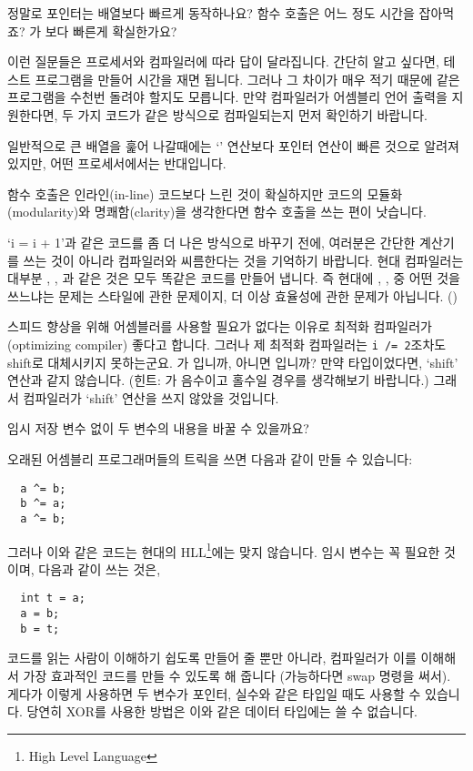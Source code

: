 \begin{faq}
	정말로 포인터는 배열보다 빠르게 동작하나요?
	함수 호출은 어느 정도 시간을 잡아먹죠?
	가 보다 빠른게 확실한가요?

\A
	이런 질문들은 프로세서와 컴파일러에 따라 답이 달라집니다.
	간단히 알고 싶다면, 테스트 프로그램을 만들어 시간을 재면 됩니다.
	그러나 그 차이가 매우 적기 때문에 같은 프로그램을 수천번 돌려야
	할지도 모릅니다.  만약 컴파일러가 어셈블리 언어 출력을 지원한다면,
	두 가지 코드가 같은 방식으로 컴파일되는지 먼저 확인하기 바랍니다.

	일반적으로 큰 배열을 훑어 나갈때에는 `\TT{[]}' 연산보다
	포인터 연산이 빠른 것으로 알려져 있지만, 어떤 프로세서에서는
	반대입니다.

	함수 호출은 인라인(in-line) 코드보다 느린 것이 확실하지만 
	코드의 모듈화(modularity)와 명쾌함(clarity)을 생각한다면
	함수 호출을 쓰는 편이 낫습니다.

	`i = i + 1'과 같은 코드를 좀 더 나은 방식으로 바꾸기 전에,
	여러분은 간단한 계산기를 쓰는 것이 아니라 컴파일러와 씨름한다는
	것을 기억하기 바랍니다.  현대 컴파일러는 대부분
	, , 과 같은 것은 모두
	똑같은 코드를 만들어 냅니다.  즉 현대에 , ,
	 중 어떤 것을 쓰느냐는 문제는 스타일에 관한 문제이지,
	더 이상 효율성에 관한 문제가 아닙니다.
	()
\end{faq}

\begin{faq}
	스피드 향상을 위해 어셈블러를 사용할 필요가 없다는 이유로
	최적화 컴파일러가 (optimizing compiler) 좋다고 합니다.  그러나
	제 최적화 컴파일러는 \verb+i /= 2+조차도 shift로 대체시키지 못하는군요.
\A
	가 입니까, 아니면 입니까?
	만약  타입이었다면, `shift' 연산과 같지 않습니다.
	(힌트: 가 음수이고 홀수일 경우를 생각해보기 바랍니다.)
	그래서 컴파일러가 `shift' 연산을 쓰지 않았을 것입니다.
\end{faq}

\begin{faq}
	임시 저장 변수 없이 두 변수의 내용을 바꿀 수 있을까요?

\A
	오래된 어셈블리 프로그래머들의 트릭을 쓰면 다음과 같이 만들 수 있습니다:
\begin{verbatim}
  a ^= b;
  b ^= a;
  a ^= b;
\end{verbatim}
	\noindent 그러나 이와 같은 코드는 현대의 HLL\footnote{High Level
	Language}에는 맞지 않습니다.  임시 변수는 꼭 필요한 것이며, 다음과
	같이 쓰는 것은,

\begin{verbatim}
  int t = a;
  a = b;
  b = t;
\end{verbatim}
	\noindent 코드를 읽는 사람이 이해하기 쉽도록 만들어 줄 뿐만 아니라,
	컴파일러가 이를 이해해서 가장 효과적인 코드를 만들 수 있도록 해 줍니다
	(가능하다면 swap 명령을 써서).  게다가 이렇게 사용하면 두 변수가
	포인터, 실수와 같은 타입일 때도 사용할 수 있습니다.  당연히 XOR를
	사용한 방법은 이와 같은 데이터 타입에는 쓸 수 없습니다.
\end{faq}


